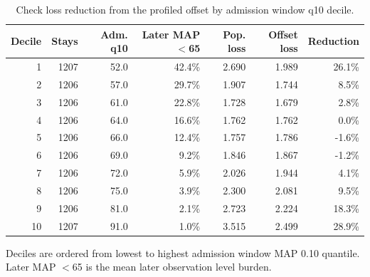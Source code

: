 \begin{table}[!htbp]
\caption{Check loss reduction from the profiled offset by admission window q10 decile.}
\label{tab:model_gain_deciles}
\centering
\begin{tabular}{rrrrrrr}
\hline
Decile & Stays & Adm. q10 & Later MAP $<$65 & Pop. loss & Offset loss & Reduction\\
\hline
1 & 1207 & 52.0 & 42.4\% & 2.690 & 1.989 & 26.1\%\\
2 & 1206 & 57.0 & 29.7\% & 1.907 & 1.744 & 8.5\%\\
3 & 1206 & 61.0 & 22.8\% & 1.728 & 1.679 & 2.8\%\\
4 & 1206 & 64.0 & 16.6\% & 1.762 & 1.762 & 0.0\%\\
5 & 1206 & 66.0 & 12.4\% & 1.757 & 1.786 & -1.6\%\\
6 & 1206 & 69.0 & 9.2\% & 1.846 & 1.867 & -1.2\%\\
7 & 1206 & 72.0 & 5.9\% & 2.026 & 1.944 & 4.1\%\\
8 & 1206 & 75.0 & 3.9\% & 2.300 & 2.081 & 9.5\%\\
9 & 1206 & 81.0 & 2.1\% & 2.723 & 2.224 & 18.3\%\\
10 & 1207 & 91.0 & 1.0\% & 3.515 & 2.499 & 28.9\%\\
\hline
\end{tabular}
\par\smallskip
\footnotesize{Deciles are ordered from lowest to highest admission window MAP 0.10 quantile. Later MAP $<$65 is the mean later observation level burden.}
\end{table}

